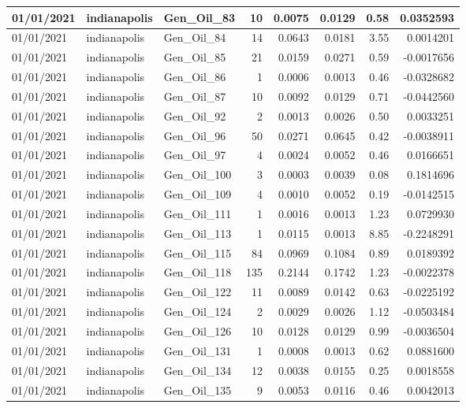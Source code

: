 \documentclass[
  letterpaper,
  DIV=11,
  numbers=noendperiod]{scrartcl}
\begin{document}
\begin{tabular}{l|l|l|r|r|r|r|r}
\hline
01/01/2021 & indianapolis & Gen\_Oil\_83 & 10 & 0.0075 & 0.0129 & 0.58 & 0.0352593\\
\hline
01/01/2021 & indianapolis & Gen\_Oil\_84 & 14 & 0.0643 & 0.0181 & 3.55 & 0.0014201\\
\hline
01/01/2021 & indianapolis & Gen\_Oil\_85 & 21 & 0.0159 & 0.0271 & 0.59 & -0.0017656\\
\hline
01/01/2021 & indianapolis & Gen\_Oil\_86 & 1 & 0.0006 & 0.0013 & 0.46 & -0.0328682\\
\hline
01/01/2021 & indianapolis & Gen\_Oil\_87 & 10 & 0.0092 & 0.0129 & 0.71 & -0.0442560\\
\hline
01/01/2021 & indianapolis & Gen\_Oil\_92 & 2 & 0.0013 & 0.0026 & 0.50 & 0.0033251\\
\hline
01/01/2021 & indianapolis & Gen\_Oil\_96 & 50 & 0.0271 & 0.0645 & 0.42 & -0.0038911\\
\hline
01/01/2021 & indianapolis & Gen\_Oil\_97 & 4 & 0.0024 & 0.0052 & 0.46 & 0.0166651\\
\hline
01/01/2021 & indianapolis & Gen\_Oil\_100 & 3 & 0.0003 & 0.0039 & 0.08 & 0.1814696\\
\hline
01/01/2021 & indianapolis & Gen\_Oil\_109 & 4 & 0.0010 & 0.0052 & 0.19 & -0.0142515\\
\hline
01/01/2021 & indianapolis & Gen\_Oil\_111 & 1 & 0.0016 & 0.0013 & 1.23 & 0.0729930\\
\hline
01/01/2021 & indianapolis & Gen\_Oil\_113 & 1 & 0.0115 & 0.0013 & 8.85 & -0.2248291\\
\hline
01/01/2021 & indianapolis & Gen\_Oil\_115 & 84 & 0.0969 & 0.1084 & 0.89 & 0.0189392\\
\hline
01/01/2021 & indianapolis & Gen\_Oil\_118 & 135 & 0.2144 & 0.1742 & 1.23 & -0.0022378\\
\hline
01/01/2021 & indianapolis & Gen\_Oil\_122 & 11 & 0.0089 & 0.0142 & 0.63 & -0.0225192\\
\hline
01/01/2021 & indianapolis & Gen\_Oil\_124 & 2 & 0.0029 & 0.0026 & 1.12 & -0.0503484\\
\hline
01/01/2021 & indianapolis & Gen\_Oil\_126 & 10 & 0.0128 & 0.0129 & 0.99 & -0.0036504\\
\hline
01/01/2021 & indianapolis & Gen\_Oil\_131 & 1 & 0.0008 & 0.0013 & 0.62 & 0.0881600\\
\hline
01/01/2021 & indianapolis & Gen\_Oil\_134 & 12 & 0.0038 & 0.0155 & 0.25 & 0.0018558\\
\hline
01/01/2021 & indianapolis & Gen\_Oil\_135 & 9 & 0.0053 & 0.0116 & 0.46 & 0.0042013\\

\end{tabular}
\end{document}
